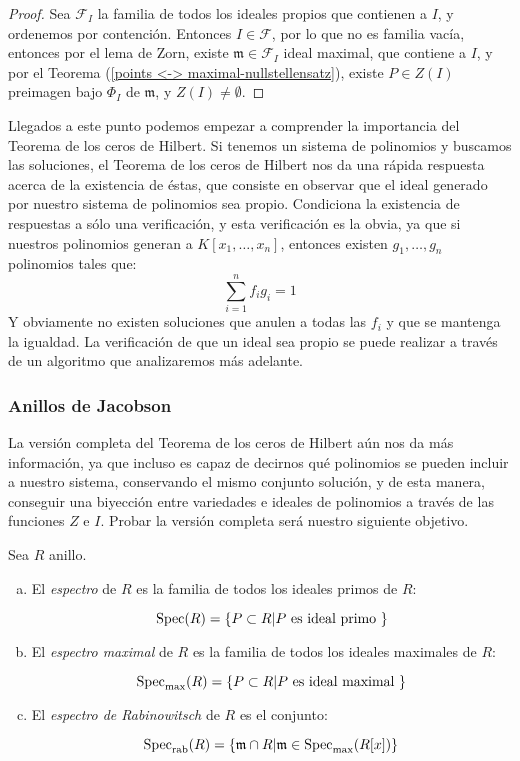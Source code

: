 \begin{proof}
Sea $\mathscr{F}_I$ la familia de todos los ideales propios que contienen a $I$, y ordenemos por contención. Entonces $I \in \mathscr{F}$, por lo que no es familia vacía, entonces por el lema de Zorn, existe $\mathfrak{m} \in \mathscr{F}_I$ ideal maximal, que contiene a $I$, y por el Teorema (\ref{points <-> maximal-nullstellensatz}), existe $P \in Z(I)$ preimagen bajo $\Phi_I$ de $\mathfrak{m}$, y $Z(I) \neq \emptyset$.
\end{proof}

Llegados a este punto podemos empezar a comprender la importancia del Teorema de los ceros de Hilbert. Si tenemos un sistema de polinomios y buscamos las soluciones, el Teorema de los ceros de Hilbert nos da una rápida respuesta acerca de la existencia de éstas, que consiste en observar que el ideal generado por nuestro sistema de polinomios sea propio. Condiciona la existencia de respuestas a sólo una verificación, y esta verificación es la obvia, ya que si nuestros polinomios generan a $K[x_1, \dots, x_n]$, entonces existen $g_1,\dots, g_n$ polinomios tales que: 
$$ \sum_{i=1}^{n}f_ig_i = 1$$
Y obviamente no existen soluciones que anulen a todas las $f_i$ y que se mantenga la igualdad. La verificación de que un ideal sea propio se puede realizar a través de un algoritmo que analizaremos más adelante.

\subsubsection{Anillos de Jacobson}

La versión completa del Teorema de los ceros de Hilbert aún nos da más información, ya que incluso es capaz de decirnos qué polinomios se pueden incluir a nuestro sistema, conservando el mismo conjunto solución, y de esta manera, conseguir una biyección entre variedades e ideales de polinomios a través de las funciones $Z$ e $I$. Probar la versión completa será nuestro siguiente objetivo.

\begin{definition}
Sea $R$ anillo.
\begin{enumerate}[(a)]
\item El \emph{espectro} de $R$ es la familia de todos los ideales primos de $R$:

$$ \textrm{Spec}(R) = \{P \subset R | P \textrm{ es ideal primo }\} $$

\item El \emph{espectro maximal} de $R$ es la familia de todos los ideales maximales de $R$:

$$ \textrm{Spec}_{\textrm{max}}(R) = \{P \subset R | P \textrm{ es ideal maximal }\}$$

\item El \emph{espectro de Rabinowitsch} de $R$ es el conjunto:

$$ \textrm{Spec}_{\textrm{rab}}(R) = \{\mathfrak{m} \cap R | \mathfrak{m} \in \textrm{Spec}_{\textrm{max}}(R[x])\}$$

\end{enumerate}
\end{definition}

